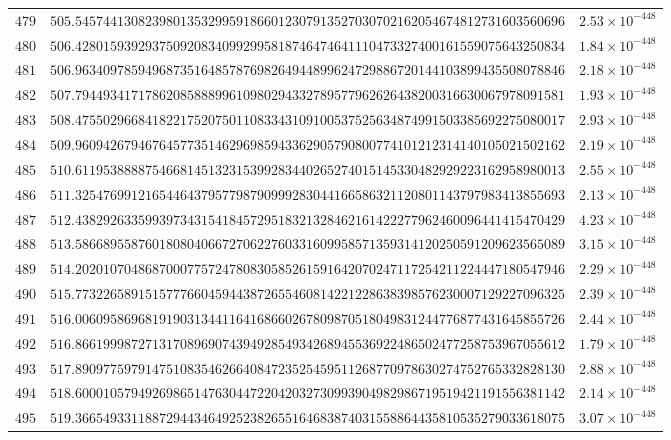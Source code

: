 \documentclass[12pt,reqno]{amsart}
\theoremstyle{remark}
\begin{document}
\begin{longtable}{clc}
$479$ & $505.5457441308239801353299591866012307913527030702162054674812731603560696$ & $2.53\times 10^{-448}$ \\
$480$ & $506.4280159392937509208340992995818746474641110473327400161559075643250834$ & $1.84\times 10^{-448}$ \\
$481$ & $506.9634097859496873516485787698264944899624729886720144103899435508078846$ & $2.18\times 10^{-448}$ \\
$482$ & $507.7944934171786208588899610980294332789577962626438200316630067978091581$ & $1.93\times 10^{-448}$ \\
$483$ & $508.4755029668418221752075011083343109100537525634874991503385692275080017$ & $2.93\times 10^{-448}$ \\
$484$ & $509.9609426794676457735146296985943362905790800774101212314140105021502162$ & $2.19\times 10^{-448}$ \\
$485$ & $510.6119538888754668145132315399283440265274015145330482929223162958980013$ & $2.55\times 10^{-448}$ \\
$486$ & $511.3254769912165446437957798790999283044166586321120801143797983413855693$ & $2.13\times 10^{-448}$ \\
$487$ & $512.4382926335993973431541845729518321328462161422277962460096441415470429$ & $4.23\times 10^{-448}$ \\
$488$ & $513.5866895587601808040667270622760331609958571359314120250591209623565089$ & $3.15\times 10^{-448}$ \\
$489$ & $514.2020107048687000775724780830585261591642070247117254211224447180547946$ & $2.29\times 10^{-448}$ \\
$490$ & $515.7732265891515777660459443872655460814221228638398576230007129227096325$ & $2.39\times 10^{-448}$ \\
$491$ & $516.0060958696819190313441164168660267809870518049831244776877431645855726$ & $2.44\times 10^{-448}$ \\
$492$ & $516.8661999872713170896907439492854934268945536922486502477258753967055612$ & $1.79\times 10^{-448}$ \\
$493$ & $517.8909775979147510835462664084723525459511268770978630274752765332828130$ & $2.88\times 10^{-448}$ \\
$494$ & $518.6000105794926986514763044722042032730993904982986719519421191556381142$ & $2.14\times 10^{-448}$ \\
$495$ & $519.3665493311887294434649252382655164683874031558864435810535279033618075$ & $3.07\times 10^{-448}$ \\

\end{longtable}
\end{document}
